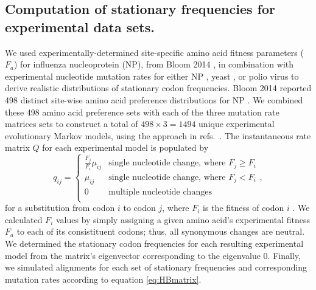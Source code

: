 \documentclass[11pt]{article}
\begin{document}
\subsection*{Computation of stationary frequencies for experimental data sets.}
We used experimentally-determined site-specific amino acid fitness parameters ($F_a$) for influenza nucleoprotein (NP), from Bloom 2014 \cite{Bloom2014a}, in combination with experimental nucleotide mutation rates for either NP \cite{Bloom2014a}, yeast \cite{Zhu2014}, or polio virus \cite{Acevedo2014} to derive realistic distributions of stationary codon frequencies. Bloom 2014 reported 498 distinct site-wise amino acid preference distributions for NP \cite{Bloom2014a}. We combined these 498 amino acid preference sets with each of the three mutation rate matrices sets to construct a total of $498 \times 3 = 1494$ unique experimental evolutionary Markov models, using the approach in refs.\ \cite{Bloom2014a,Bloom2014b}. The instantaneous rate matrix $Q$ for each experimental model is populated by 
\begin{equation}
q_{ij} =  \left\{ 
\begin{array}{rl}
  \frac{F_j}{F_i}\mu_{ij} &\mbox{single nucleotide change, where $F_j \geq F_i$} \\
  \mu_{ij}                &\mbox{single nucleotide change, where $F_j < F_i$}  \\ 
  0                       &\mbox{multiple nucleotide changes} \\        
\end{array} \right.,
\end{equation}
for a substitution from codon $i$ to codon $j$, where $F_i$ is the fitness of codon $i$ \cite{Bloom2014a,Bloom2014b}. We calculated $F_i$ values by simply assigning a given amino acid's experimental fitness $F_a$ to each of its consistituent codons; thus, all synonymous changes are neutral. We determined the stationary codon frequencies for each resulting experimental model from the matrix's eigenvector corresponding to the eigenvalue 0. Finally, we simulated alignments for each set of stationary frequencies and corresponding mutation rates according to equation \eqref{eq:HBmatrix}.   

		
\end{document}
